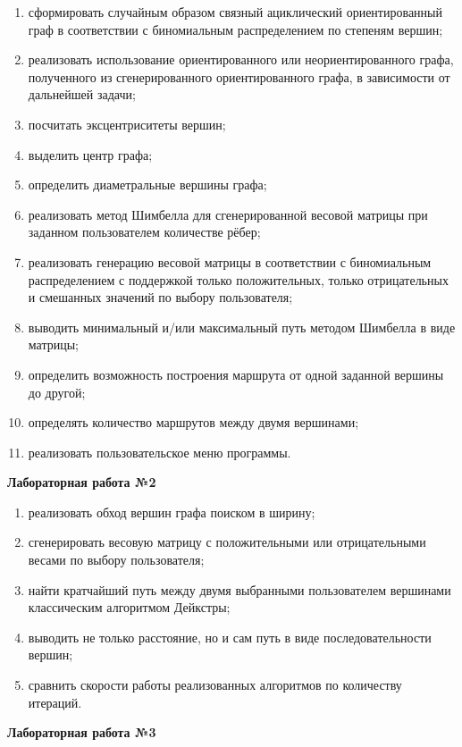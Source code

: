 \documentclass[14pt,a4paper]{extarticle}
\begin{document}
\begin{enumerate}
    \item сформировать случайным образом связный ациклический ориентированный граф в соответствии с биномиальным распределением по степеням вершин;
    \item реализовать использование ориентированного или неориентированного графа, полученного из сгенерированного ориентированного графа, в зависимости от дальнейшей задачи;
    \item посчитать эксцентриситеты вершин;
    \item выделить центр графа;
    \item определить диаметральные вершины графа;
    \item реализовать метод Шимбелла для сгенерированной весовой матрицы при заданном пользователем количестве рёбер;
    \item реализовать генерацию весовой матрицы в соответствии с биномиальным распределением с поддержкой только положительных, только отрицательных и смешанных значений по выбору пользователя;
    \item выводить минимальный и/или максимальный путь методом Шимбелла в виде матрицы;
    \item определить возможность построения маршрута от одной заданной вершины до другой;
    \item определять количество маршрутов между двумя вершинами;
    \item реализовать пользовательское меню программы.
\end{enumerate}

\textbf{Лабораторная работа №2}

\begin{enumerate}[start=12]
    \item реализовать обход вершин графа поиском в ширину;
    \item сгенерировать весовую матрицу с положительными или отрицательными весами по выбору пользователя;
    \item найти кратчайший путь между двумя выбранными пользователем вершинами классическим алгоритмом Дейкстры;
    \item выводить не только расстояние, но и сам путь в виде последовательности вершин;
    \item сравнить скорости работы реализованных алгоритмов по количеству итераций.
\end{enumerate}

\textbf{Лабораторная работа №3}
\end{document}
